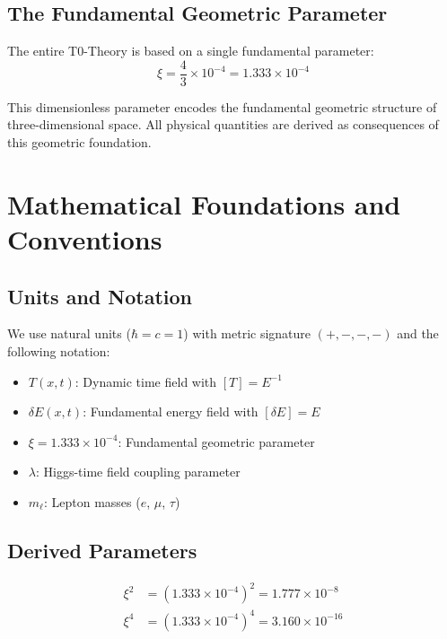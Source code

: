 \documentclass[12pt,a4paper]{article}
\begin{document}
	\subsection{The Fundamental Geometric Parameter}
	
	\begin{keyresult}
		The entire T0-Theory is based on a single fundamental parameter:
		\begin{equation}
			\boxed{\xi = \frac{4}{3} \times 10^{-4} = 1.333 \times 10^{-4}}
		\end{equation}
		
		This dimensionless parameter encodes the fundamental geometric structure of three-dimensional space. All physical quantities are derived as consequences of this geometric foundation.
	\end{keyresult}
	
	\section{Mathematical Foundations and Conventions}
	
	\subsection{Units and Notation}
	
	We use natural units ($\hbar = c = 1$) with metric signature $(+,-,-,-)$ and the following notation:
	
	\begin{itemize}
		\item $T(x,t)$: Dynamic time field with $[T] = E^{-1}$
		\item $\delta E(x,t)$: Fundamental energy field with $[\delta E] = E$
		\item $\xi = 1.333 \times 10^{-4}$: Fundamental geometric parameter
		\item $\lambda$: Higgs-time field coupling parameter
		\item $m_\ell$: Lepton masses ($e$, $\mu$, $\tau$)
	\end{itemize}
	
	\subsection{Derived Parameters}
	
	\begin{align}
		\xi^2 &= (1.333 \times 10^{-4})^2 = 1.777 \times 10^{-8} \\
		\xi^4 &= (1.333 \times 10^{-4})^4 = 3.160 \times 10^{-16}
	\end{align}
	
\end{document}
